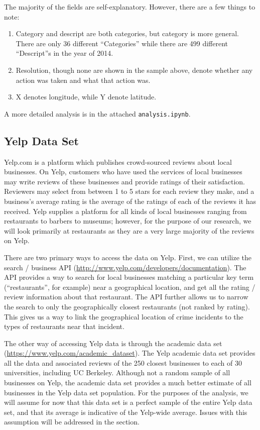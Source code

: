 \documentclass{article}
\begin{document}
The majority of the fields are self-explanatory. However, there are a few
things to note:
\begin{enumerate}
\item Category and descript are both categories, but category is more
  general. There are only 36 different ``Categories'' while there are 499
  different ``Descript''s in the year of 2014.
\item Resolution, though none are shown in the sample above, denote whether
  any action was taken and what that action was.
\item X denotes longitude, while Y denote latitude.
\end{enumerate}

A more detailed analysis is in the attached \texttt{analysis.ipynb}.

\subsection{Yelp Data Set}

Yelp.com is a platform which publishes crowd-sourced reviews about local
businesses. On Yelp, customers who have used the services of local
businesses may write reviews of these businesses and provide ratings of
their satisfaction. Reviewers may select from between 1 to 5 stars for each
review they make, and a business's average rating is the average of the
ratings of each of the reviews it has received. Yelp supplies a platform
for all kinds of local businesses ranging from restaurants to barbers to
museums; however, for the purpose of our research, we will look primarily
at restaurants as they are a very large majority of the reviews on Yelp.

There are two primary ways to access the data on Yelp. First, we can
utilize the search / business API
(\url{http://www.yelp.com/developers/documentation}). The API provides a
way to search for local businesses matching a particular key term
(``restaurants'', for example) near a geographical location, and get all
the rating / review information about that restaurant. The API further
allows us to narrow the search to only the geographically closest
restaurants (not ranked by rating). This gives us a way to link the
geographical location of crime incidents to the types of restaurants near
that incident.

The other way of accessing Yelp data is through the academic data set
(\url{https://www.yelp.com/academic_dataset}). The Yelp academic data set
provides all the data and associated reviews of the 250 closest businesses
to each of 30 universities, including UC Berkeley. Although not a random
sample of all businesses on Yelp, the academic data set provides a much
better estimate of all businesses in the Yelp data set population. For the
purposes of the analysis, we will assume for now that this data set is
a perfect sample of the entire Yelp data set, and that its average is
indicative of the Yelp-wide average. Issues with this assumption will be
addressed in the \textbf{} section.
\end{document}
